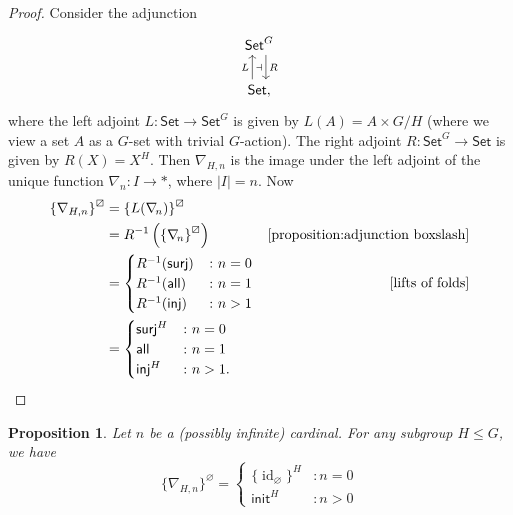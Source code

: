 \documentclass{amsart}
\renewcommand\emptyset\varnothing
\newcommand{\Set}{\mathsf{Set}}
\newcommand{\GSet}{\Set^G}
\newcommand{\rlp}[1]{{#1}^{\boxslash}}
\newcommand{\all}{\mathsf{all}}
\newcommand{\inj}{\mathsf{inj}}
\newcommand{\surj}{\mathsf{surj}}
\newcommand{\init}{\mathsf{init}}
\DeclareMathOperator{\id}{id}
\numberwithin{equation}{section}
\newtheorem{proposition}[equation]{Proposition}
\theoremstyle{definition}
\begin{document}
\begin{proof}
	Consider the adjunction
	\[\begin{tikzcd}[ampersand replacement=\&]
			\GSet \\
			\Set,
			\arrow[""{name=0, anchor=center, inner sep=0}, "{R}", shift left=2, from=1-1, to=2-1]
			\arrow[""{name=1, anchor=center, inner sep=0}, "{L}", shift left=2, from=2-1, to=1-1]
			\arrow["\dashv"{anchor=center}, draw=none, from=1, to=0]
		\end{tikzcd}\]
	where the left adjoint $L \colon \Set \to \GSet$ is given by $L(A) = A \times G/H$ (where we view a set $A$ as a $G$-set with trivial $G$-action). The right adjoint $R \colon \GSet \to \Set$ is given by $R(X) = X^H$. Then $\nabla_{\!H,n}$ is the image under the left adjoint of the unique function $\nabla_{\!n} \colon I \to \ast$, where $\lvert I \rvert = n$. Now
		\begin{align*}
			\rlp{\{\nabla_{H,n}\}}
			 & = \rlp{\{L(\nabla_{\!n})\}}
			\\
			 & = R^{-1}\left(\rlp{\{\nabla_{\!n}\}}\right)
			 & \textnormal{\Cref{proposition:adjunction boxslash}}
			\\
			 & =
			\begin{cases}
				R^{-1}(\surj) & \colon n = 0 \\
				R^{-1}(\all)  & \colon n = 1 \\
				R^{-1}(\inj)  & \colon n > 1 \\
			\end{cases}
			 & \textnormal{\cref{lifts of folds}}
			\\
			 & =
			\begin{cases}
				\surj^H & \colon n = 0  \\
				\all    & \colon n = 1  \\
				\inj^H  & \colon n > 1. \\
			\end{cases}
			\qedhere
		\end{align*}
\end{proof}

\begin{proposition}
	\label{lemma:vacuous lifting classes of nabla}
	Let $n$ be a (possibly infinite) cardinal. For any subgroup $H \leq G$, we have
		\[
			\{\nabla_{H,n}\}^\emptyset =
			\begin{cases}
				\{\id_\emptyset\}^H & \colon n = 0 \\
				\init^H             & \colon n > 0
			\end{cases}
		\]
\end{proposition}
\end{document}
